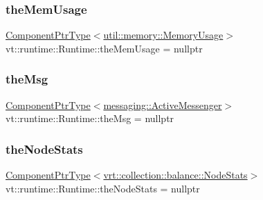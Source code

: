 \subsubsection{\texorpdfstring{the\+Mem\+Usage}{theMemUsage}}
{\footnotesize\ttfamily \hyperlink{structvt_1_1runtime_1_1_runtime_a0893bf0a8c03b898e8ab66b52cec80ad}{Component\+Ptr\+Type}$<$\hyperlink{structvt_1_1util_1_1memory_1_1_memory_usage}{util\+::memory\+::\+Memory\+Usage}$>$ vt\+::runtime\+::\+Runtime\+::the\+Mem\+Usage = nullptr}

\mbox{\label{structvt_1_1runtime_1_1_runtime_a8aad5f2fdd05ddd81995f5af94ce196e}} 
\subsubsection{\texorpdfstring{the\+Msg}{theMsg}}
{\footnotesize\ttfamily \hyperlink{structvt_1_1runtime_1_1_runtime_a0893bf0a8c03b898e8ab66b52cec80ad}{Component\+Ptr\+Type}$<$\hyperlink{structvt_1_1messaging_1_1_active_messenger}{messaging\+::\+Active\+Messenger}$>$ vt\+::runtime\+::\+Runtime\+::the\+Msg = nullptr}

\mbox{\label{structvt_1_1runtime_1_1_runtime_a93ce0722815077fc9bedcd09c429b6aa}} 
\subsubsection{\texorpdfstring{the\+Node\+Stats}{theNodeStats}}
{\footnotesize\ttfamily \hyperlink{structvt_1_1runtime_1_1_runtime_a0893bf0a8c03b898e8ab66b52cec80ad}{Component\+Ptr\+Type}$<$\hyperlink{structvt_1_1vrt_1_1collection_1_1balance_1_1_node_stats}{vrt\+::collection\+::balance\+::\+Node\+Stats}$>$ vt\+::runtime\+::\+Runtime\+::the\+Node\+Stats = nullptr}

\mbox{\label{structvt_1_1runtime_1_1_runtime_af2d01d5059edf4aed086f087e5ed1e91}} 
